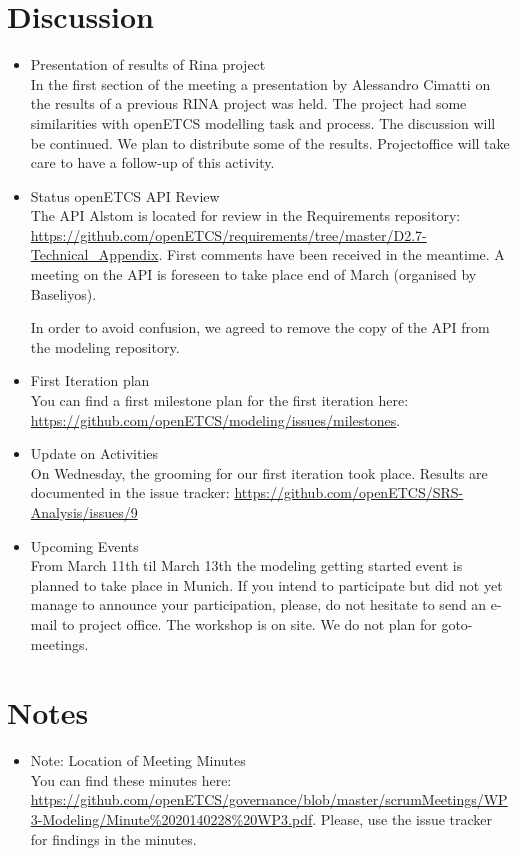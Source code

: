 \documentclass[a4paper, 11pt]{article}
\begin{document}
\section{Discussion}
\begin{itemize}
\item Presentation of results of Rina project\\
In the first section of the meeting a presentation by Alessandro Cimatti on the results of a previous RINA project was held. The project had some similarities with openETCS modelling task and process. The discussion will be continued. We plan to distribute  some of the results. Projectoffice will take care to have a follow-up of this activity.  

\item Status openETCS API Review\\
The API Alstom is located for review in the Requirements repository: \url{https://github.com/openETCS/requirements/tree/master/D2.7-Technical_Appendix}. First comments have been received in the meantime. A meeting on the API is foreseen to take place end of March (organised by Baseliyos).

In order to avoid confusion, we agreed to remove the copy of the API from the modeling repository.

\item First Iteration plan\\
You can find a first milestone plan for the first iteration here:
\url{https://github.com/openETCS/modeling/issues/milestones}. 

\item Update on Activities\\
On Wednesday, the grooming for our first iteration took place. Results are documented in the issue tracker: \url{https://github.com/openETCS/SRS-Analysis/issues/9}

\item Upcoming Events\\
From March 11th til March 13th the modeling getting started event is planned to take place in Munich. If you intend to participate but did not yet manage to announce your participation, please, do not hesitate to send an e-mail to project office. The workshop is on site. We do not plan for goto-meetings.

\end{itemize}

\section{Notes}
\begin{itemize}

\item Note: Location of Meeting Minutes\\
You can find these minutes here: \url{https://github.com/openETCS/governance/blob/master/scrumMeetings/WP3-Modeling/Minute%2020140228%20WP3.pdf}. Please, use the issue tracker for findings in the minutes.
\end{itemize}
\end{document}
